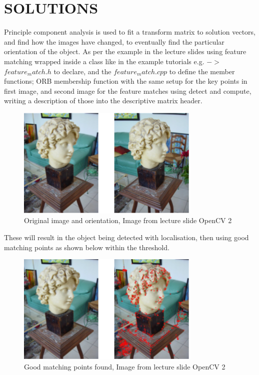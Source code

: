\documentclass[a4paper, 10pt]{IEEEconf}
\begin{document}
\section{SOLUTIONS}
Principle component analysis is used to fit a transform matrix to solution vectors, and find how the images have changed, to eventually find the particular orientation of the object. As per the example in the lecture slides using feature matching wrapped inside a class like in the example tutorials e.g. $->$ $feature_match.h$ to declare, and the $feature_match.cpp$ to define the member functions; ORB membership function with the same setup for the key points in first image, and second image for the feature matches using detect and compute, writing a description of those into the descriptive matrix header.
\begin{figure}[H]
  \includegraphics[width=0.7\linewidth,center]{images/1}
  \caption{Original image and orientation, Image from lecture slide OpenCV 2 \cite{Lecture2}}
  \label{fig:Original image and orientation}
\end{figure}
These will result in the object being detected with localisation, then using good matching points as shown below within the threshold.
\begin{figure}[H]
  \includegraphics[width=0.7\linewidth,center]{images/2}
  \caption{Good matching points found, Image from lecture slide OpenCV 2 \cite{Lecture2}}
  \label{fig:Good matching points found}
\end{figure}
\end{document}
